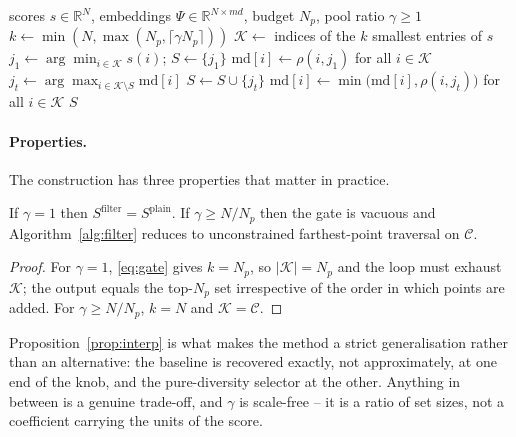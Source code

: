 \begin{algorithm}[t]
\caption{Quality-gated farthest-point base selection}
\label{alg:filter}
\begin{algorithmic}[1]
\Require scores $s\in\mathbb{R}^{N}$, embeddings $\Psi\in\mathbb{R}^{N\times md}$,
         budget $N_p$, pool ratio $\gamma\ge1$
\State $k\gets\min(N,\max(N_p,\lceil\gamma N_p\rceil))$
\State $\mathcal{K}\gets$ indices of the $k$ smallest entries of $s$
\State $j_1\gets\arg\min_{i\in\mathcal{K}}s(i)$;\quad
       $S\gets\{j_1\}$
\State $\mathrm{md}[i]\gets\rho(i,j_1)$ for all $i\in\mathcal{K}$
  \State $j_t\gets\arg\max_{i\in\mathcal{K}\setminus S}\mathrm{md}[i]$
  \State $S\gets S\cup\{j_t\}$
  \State $\mathrm{md}[i]\gets\min\bigl(\mathrm{md}[i],\rho(i,j_t)\bigr)$
         for all $i\in\mathcal{K}$
\EndFor
\State \Return $S$
\end{algorithmic}
\end{algorithm}

\paragraph{Properties.}
The construction has three properties that matter in practice.

\begin{proposition}
\label{prop:interp}
If $\gamma=1$ then $S^{\mathrm{filter}}=S^{\mathrm{plain}}$.  If
$\gamma\ge N/N_p$ then the gate is vacuous and Algorithm~\ref{alg:filter}
reduces to unconstrained farthest-point traversal on $\mathcal{C}$.
\end{proposition}
\begin{proof}
For $\gamma=1$, \eqref{eq:gate} gives $k=N_p$, so $|\mathcal{K}|=N_p$ and the
loop must exhaust $\mathcal{K}$; the output equals the top-$N_p$ set
irrespective of the order in which points are added.  For $\gamma\ge N/N_p$,
$k=N$ and $\mathcal{K}=\mathcal{C}$.
\end{proof}

Proposition~\ref{prop:interp} is what makes the method a strict
generalisation rather than an alternative: the baseline is recovered exactly,
not approximately, at one end of the knob, and the pure-diversity selector at
the other.  Anything in between is a genuine trade-off, and $\gamma$ is
scale-free -- it is a ratio of set sizes, not a coefficient carrying the units
of the score.

